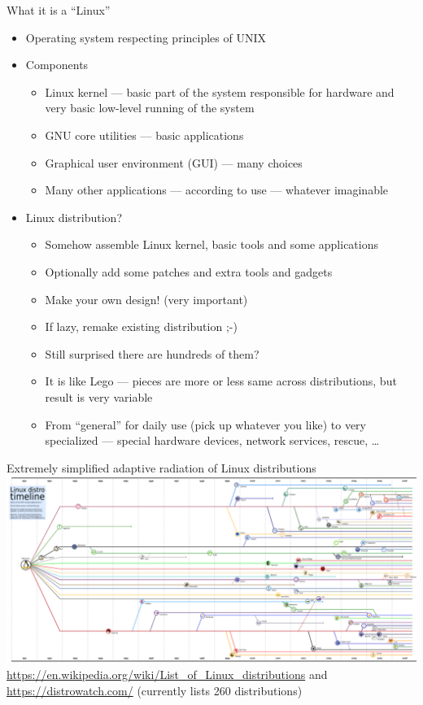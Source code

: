 \documentclass[compress, ucs, xelatex, 11pt, xcolor=svgnames,
  hyperref={
    bookmarks=true,
    unicode=true,
    colorlinks=true,
    pdftitle={Linux, command line and MetaCentrum},
    plainpages=false,
    pdfauthor={Vojtech Zeisek},
    pdfsubject={Course about use of Linux command line, writing shell scripts and using MetaCentrum of CESNET},
    pdfcreator={XeLaTeX, http://www.xelatex.org/},
    pdfkeywords={Linux, GNU, BASH, shell, command line, MetaCentrum},
    linkcolor=Sienna,
    anchorcolor=black,
    citecolor=green,
    filecolor=magenta,
    menucolor=Sienna,
    urlcolor=cyan,
    pdftex},
  url={hyphens, lowtilde} %
  ]{beamer}
\begin{document}
\begin{frame}{What it is a ``Linux''}
\begin{itemize}
  \item Operating system respecting principles of UNIX
  \item Components
  \begin{itemize}
    \item Linux kernel --- basic part of the system responsible for hardware and very basic low-level running of the system
    \item GNU core utilities --- basic applications
    \item Graphical user environment (GUI) --- many choices
    \item Many other applications --- according to use --- whatever imaginable
  \end{itemize}
  \item Linux distribution?
  \begin{itemize}
    \item Somehow assemble Linux kernel, basic tools and some applications
    \item Optionally add some patches and extra tools and gadgets
    \item Make your own design! (very important)
    \item If lazy, remake existing distribution ;-)
    \item Still surprised there are hundreds of them?
    \item It is like Lego --- pieces are more or less same across distributions, but result is very variable
    \item From ``general'' for daily use (pick up whatever you like) to very specialized --- special hardware devices, network services, rescue, \ldots
  \end{itemize}
\end{itemize}
\end{frame}

\begin{frame}{Extremely simplified adaptive radiation of Linux distributions}
\includegraphics[width=\textwidth]{linux_fylogen_2.png}\\
\url{https://en.wikipedia.org/wiki/List_of_Linux_distributions} and \url{https://distrowatch.com/} (currently lists 260 distributions)
\end{frame}
\end{document}

